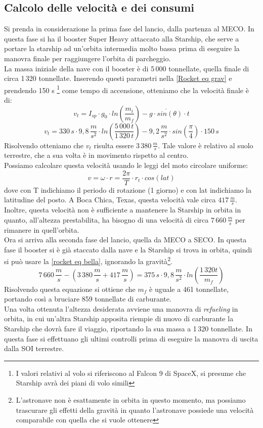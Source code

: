 \subsection{Calcolo delle velocità e dei consumi}
Si prenda in considerazione la prima fase del lancio, dalla partenza al MECO. In questa fase si ha il booster Super Heavy attaccato alla Starship, che serve a portare la starship ad un'orbita intermedia molto bassa prima di eseguire la manovra finale per raggiungere l'orbita di parcheggio.\\
La massa iniziale della nave con il booster è di 5\,000 tonnellate, quella finale di circa 1\,320 tonnellate.
Inserendo questi parametri nella \ref{Rocket eq grav} e prendendo 150 s \footnote{I valori relativi al volo si riferiscono al Falcon 9 di SpaceX, si presume che Starship avrà dei piani di volo simili} come tempo di accensione, otteniamo che la velocità finale è di:
$$
v_t = I_{sp} \cdot g_0 \cdot ln\left(\frac{m_i}{m_f}\right) - \overline{g \cdot sin(\theta)} \cdot t
$$
$$
v_t = 330\,s \cdot 9,8\,\frac{m}{s^2} \cdot ln\left(\frac{5\,000\,t}{1\,320\,t}\right) - 9,2\,\frac{m}{s^2} \cdot sin\left(\frac{\pi}{4}\right) \cdot 150\,s
$$
Risolvendo otteniamo che $v_t$ risulta essere $3\,380\,\frac{m}{s}$. Tale valore è relativo al suolo terrestre, che a sua volta è in movimento rispetto al centro.\\
Possiamo calcolare questa velocità usando le leggi del moto circolare uniforme:\\
$$
v = \omega \cdot r = \frac{2 \pi}{T} \cdot r_t \cdot cos(lat)
$$
dove con T indichiamo il periodo di rotazione (1 giorno) e con lat indichiamo la latitudine del posto.
A Boca Chica, Texas, questa velocità vale circa $417\,\frac{m}{s}$.\\
Inoltre, questa velocità non è sufficiente a mantenere la Starship in orbita in quanto, all'altezza prestabilita, ha bisogno di una velocità di circa 
$7\,660\,\frac{m}{s}$ per rimanere in quell'orbita.\\
Ora si arriva alla seconda fase del lancio, quella da MECO a SECO. In questa fase il booster si è già staccato dalla nave e la Starship si trova in orbita, quindi si può usare la \ref{rocket eq bella}, ignorando la gravità\footnote{L'astronave non è esattamente in orbita in questo momento, ma possiamo trascurare gli effetti della gravità in quanto l'astronave possiede una velocità comparabile con quella che si vuole ottenere}.
$$
7\,660\,\frac{m}{s} - (3\,380\,\frac{m}{s} + 417\,\frac{m}{s})= 375\,s \cdot 9,8\,\frac{m}{s^2} \cdot ln\left(\frac{1\,320t}{m_f}\right)
$$
Risolvendo questa equazione si ottiene che $m_f$ è uguale a 461 tonnellate, portando così a bruciare 859 tonnellate di carburante.\\
Una volta ottenuta l'altezza desiderata avviene una manovra di \textit{refueling} in orbita, in cui un'altra Starship apposita riempie di nuovo di carburante la Starship che dovrà fare il viaggio, riportando la sua massa a 1\,320 tonnellate. In questa fase si effettuano gli ultimi controlli prima di eseguire la manovra di uscita dalla SOI terrestre.
